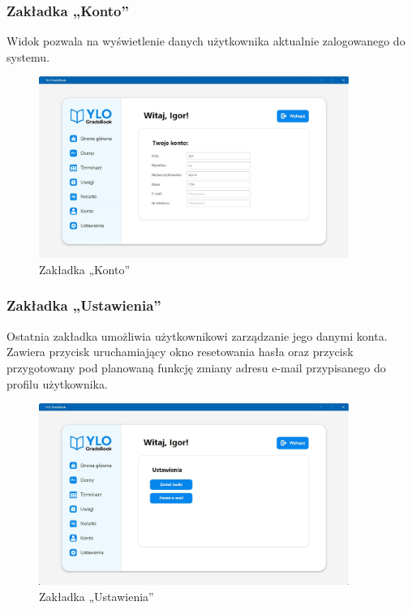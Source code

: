 \subsubsection{Zakładka „Konto”}
Widok pozwala na wyświetlenie danych użytkownika aktualnie zalogowanego do systemu.
\begin{figure}[H]
    \centering
    \includegraphics[width=0.9\textwidth]{figures/StudentWindow/fig_0014.eps}
    \caption{Zakładka „Konto”}
    \label{fig:accountPane}
\end{figure}

\subsubsection{Zakładka „Ustawienia”}
Ostatnia zakładka umożliwia użytkownikowi zarządzanie jego danymi konta. Zawiera przycisk uruchamiający okno resetowania hasła oraz przycisk przygotowany pod planowaną funkcję zmiany adresu e-mail przypisanego do profilu użytkownika.
\begin{figure}[H]
    \centering
    \includegraphics[width=0.9\textwidth]{figures/StudentWindow/fig_0015.eps}
    \caption{Zakładka „Ustawienia”}
    \label{fig:settingsPane}
\end{figure}

